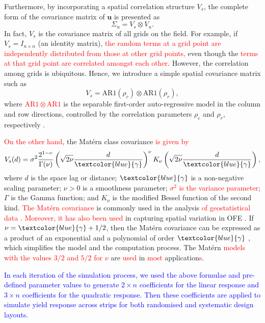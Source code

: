 \documentclass[a4paper]{article} 	%
\newcommand{\Matern}{Mat\'ern }
\newcommand{\AR}{\mathrm{AR1}}
\newcommand{\revision}[1]{\textcolor{red}{#1}}
\newcommand{\zc}[1]{\textcolor{blue}{#1}}
\begin{document}
Furthermore, by incorporating a spatial correlation structure $V_s$, the complete form of the covariance matrix of $\bm{u}$ is presented as 
\begin{equation}\label{eq:varu}
	\Sigma_u = V_s \otimes V_u. 
\end{equation}
In fact, $V_s$ is the covariance matrix of all grids on the field. For example, if $V_s=I_{n\times n}$ (an identity matrix), \revision{the random terms at a grid point are independently distributed from those at other grid points,} even though the \revision{terms at that grid point are correlated amongst each other}. However, the correlation among grids is ubiquitous. Hence, we introduce a simple spatial covariance matrix such as 
\begin{equation}\label{eq:ar1cov}
	V_s = \AR(\rho_c)\otimes \AR(\rho_r),
\end{equation}
where \revision{$\AR \otimes \AR$} is the separable first-order auto-regressive model in the column and row directions, controlled by the correlation parameters $\rho_c$ and $\rho_r$, respectively \parencite{Butler2017ASRemlR}. 

\revision{On the other hand}, the \Matern class covariance \revision{is given by}
\begin{equation}\label{eq:matcov}
V_s(d) = \sigma^2 \frac{2^{1-\nu}}{\Gamma(\nu)} \left( \sqrt{2\nu} \frac{d}{\zc{\gamma}}\right)^\nu K_\nu\left( \sqrt{2\nu} \frac{d}{\zc{\gamma}}\right),
\end{equation}
 where $d$ is the space lag or distance; $\zc{\gamma}$ is a non-negative scaling parameter; $\nu> 0$ is a smoothness parameter; \revision{$\sigma^2$ is the variance parameter}; $\Gamma$ is the Gamma function; and $K_\nu$ is the modified Bessel function of the second kind. \revision{The \Matern covariance} is commonly used in the analysis \revision{of geostatistical data} \parencite{Cressie1999Classes}. \revision{Moreover, it has also been used} in capturing spatial variation in OFE \parencite{Selle2019Flexible}. If $\nu = \zc{\gamma} + 1/2$, then the \Matern covariance can be expressed as a product of an exponential and a polynomial of order $\zc{\gamma}$ \parencite{Pandit2019Comparative, Abramowitz1974Handbook}, which simplifies the model and the computation process. The \Matern \revision{models} \revision{with the values $3/2$ and $5/2$ for $\nu$} are \revision{used} in \revision{most} application\revision{s}. 


\zc{In each iteration of the simulation process, we used the above formulae and pre-defined parameter values to generate $2\times n$ coefficients for the linear response and $3\times n$ coefficients for the quadratic response. Then these coefficients are applied to simulate yield response across strips for both  randomised and systematic design layouts.}
\end{document}

